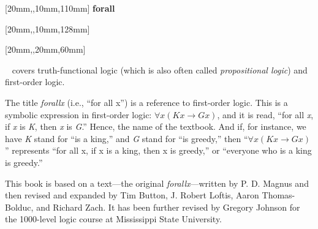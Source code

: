 \documentclass[bleedwidth=3.17mm, marklength=0mm, coverheight=228.6mm, coverwidth=152.4mm, spinewidth=14.05mm]{bookcover} %
\begin{document}
\begin{bookcover}

[20mm,,10mm,110mm]{\sffamily   %
\fontsize{44}{44}\selectfont\hfill \textbf{forall\textcolor{white}{x}}} 		%

[20mm,,10mm,128mm]{\sffamily
\fontsize{20}{20}\selectfont\hfill \textbf{\textls{\textcolor{white}{THE MISSISSIPPI STATE EDITION}}}}  







[20mm,,20mm,60mm]{\sffamily    %
\textcolor{white}{}~ covers truth-functional logic (which is also often called \textit{propositional logic}) and first-order logic. 

\quad The title \textit{forallx} (i.e., ``for all x'') is a reference to first-order logic. This is a symbolic expression in first-order logic: $\forall x(Kx \rightarrow Gx)$, and it is read, ``for all \textit{x}, if \textit{x} is \textit{K}, then \textit{x} is \textit{G}.'' Hence, the name of the textbook. And if, for instance, we have \textit{K} stand for ``is a king,'' and \textit{G} stand for ``is greedy,'' then ``$\forall x(Kx \rightarrow Gx)$'' represents ``for all x, if x is a king, then x is greedy,'' or ``everyone who is a king is greedy.''

\quad This book is based on a text---the original \textit{forallx}---written by P. D. Magnus and then revised and expanded by Tim Button, J. Robert Loftis, Aaron Thomas-Bolduc, and Richard Zach. It has been further revised by Gregory Johnson for the 1000-level logic course at Mississippi State University.

}
\end{bookcover}
\end{document}
